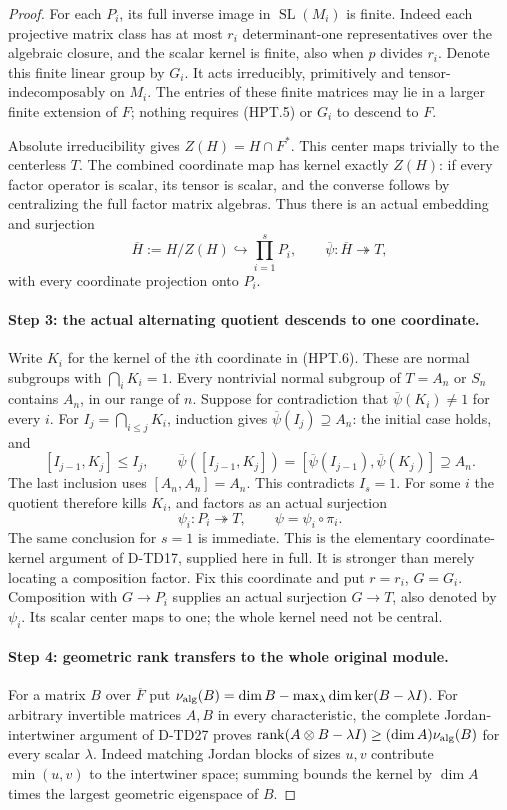 \begin{proof}
For each $P_i$, its full inverse image in
$\operatorname{SL}(M_i)$ is finite.  Indeed each projective
matrix class has at most $r_i$ determinant-one representatives
over the algebraic closure, and the scalar kernel is finite,
also when $p$ divides $r_i$.  Denote this finite linear group by
$G_i$.  It acts irreducibly, primitively and tensor-indecomposably
on $M_i$.  The entries of these finite matrices may lie in a
larger finite extension of $F$; nothing requires (HPT.5) or $G_i$
to descend to $F$.

Absolute irreducibility gives
$Z(H)=H\cap F^*$.  This center maps trivially to the centerless
$T$.  The combined coordinate map has kernel exactly $Z(H)$:
if every factor operator is scalar, its tensor is scalar, and
the converse follows by centralizing the full factor matrix
algebras.  Thus there is an actual embedding and surjection
\[
 \overline H:=H/Z(H)\hookrightarrow\prod_{i=1}^s P_i,
                 \qquad \overline\psi:\overline H\twoheadrightarrow T,
 \tag{HPT.6}
\]
with every coordinate projection onto $P_i$.

\paragraph{Step 3: the actual alternating quotient descends to one coordinate.}
Write $K_i$ for the kernel of the $i$th coordinate in (HPT.6).
These are normal subgroups with $\bigcap_iK_i=1$.
Every nontrivial normal subgroup of $T=A_n$ or $S_n$ contains
$A_n$, in our range of $n$.  Suppose for contradiction that
$\overline\psi(K_i)\ne1$ for every $i$.
For $I_j=\bigcap_{i\le j}K_i$, induction gives
$\overline\psi(I_j)\supseteq A_n$: the initial case holds,
and
\[
 [I_{j-1},K_j]\le I_j,\qquad
 \overline\psi([I_{j-1},K_j])
   =[\overline\psi(I_{j-1}),\overline\psi(K_j)]\supseteq A_n.
 \tag{HPT.7}
\]
The last inclusion uses $[A_n,A_n]=A_n$.
This contradicts $I_s=1$.  For some $i$ the quotient therefore
kills $K_i$, and factors as an actual surjection
\[
                     \psi_i:P_i\twoheadrightarrow T,
              \qquad \psi=\psi_i\circ\pi_i.
 \tag{HPT.8}
\]
The same conclusion for $s=1$ is immediate.  This is the elementary
coordinate-kernel argument of D-TD17, supplied here in full.
It is stronger than merely locating a composition factor.
Fix this coordinate and put $r=r_i$, $G=G_i$.
Composition with $G\to P_i$ supplies an actual surjection
$G\to T$, also denoted by $\psi_i$.  Its scalar center maps
to one; the whole kernel need not be central.

\paragraph{Step 4: geometric rank transfers to the whole original module.}
For a matrix $B$ over $\overline F$ put
$\nu_{\rm alg}(B)=\dim B-\max_\lambda\dim\ker(B-\lambda I)$.
For arbitrary invertible matrices $A,B$ in every characteristic,
the complete Jordan-intertwiner argument of D-TD27 proves
$\operatorname{rank}(A\otimes B-\lambda I)
\ge(\dim A)\nu_{\rm alg}(B)$ for every scalar $\lambda$.
Indeed matching Jordan blocks of sizes $u,v$ contribute
$\min(u,v)$ to the intertwiner space; summing bounds the kernel
by $\dim A$ times the largest geometric eigenspace of $B$.


\end{proof}
